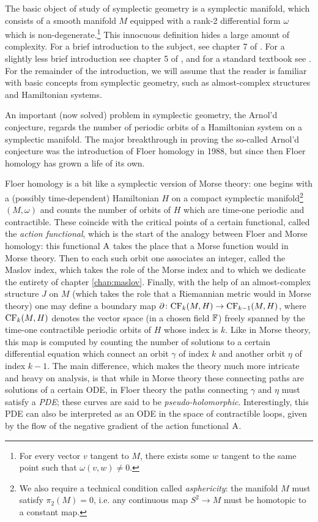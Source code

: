 The basic object of study of symplectic geometry is a symplectic manifold, which consists of a smooth manifold $M$ equipped with a rank-2 differential form $\omega$ which is non-degenerate.\footnote{For every vector $v$ tangent to $M$, there exists some $w$ tangent to the same point such that $\omega(v,w) \neq 0$.} This innocuous definition hides a large amount of complexity. For a brief introduction to the subject, see chapter 7 of \cite{polterovich}. For a slightly less brief introduction see chapter 5 of \cite{audin}, and for a standard textbook see \cite{mcduff}. For the remainder of the introduction, we will assume that the reader is familiar with basic concepts from symplectic geometry, such as almost-complex structures and Hamiltonian systems.

An important (now solved) problem in symplectic geometry, the Arnol'd conjecture, regards the number of periodic orbits of a Hamiltonian system on a symplectic manifold. The major breakthrough in proving the so-called Arnol'd conjecture was the introduction of Floer homology in 1988, but since then Floer homology has grown a life of its own.

Floer homology is a bit like a symplectic version of Morse theory: one begins with a (possibly time-dependent) Hamiltonian $H$ on a compact symplectic manifold\footnote{We also require a technical condition called \emph{asphericity}: the manifold $M$ must satisfy $\pi_2(M) = 0$, i.e. any continuous map $S^2 \to M$ must be homotopic to a constant map.} $(M,\omega)$ and counts the number of orbits of $H$ which are time-one periodic and contractible. These coincide with the critical points of a certain functional, called the \emph{action functional}, which is the start of the analogy between Floer and Morse homology: this functional $\AA$ takes the place that a Morse function would in Morse theory. Then to each such orbit one associates an integer, called the Maslov index, which takes the role of the Morse index and to which we dedicate the entirety of chapter \ref{chap:maslov}. Finally, with the help of an almost-complex structure $J$ on $M$ (which takes the role that a Riemannian metric would in Morse theory) one may define a boundary map $\partial \colon \CF_k(M,H) \to \CF_{k-1}(M,H)$, where $\CF_k(M,H)$ denotes the vector space (in a chosen field $\FF$) freely spanned by the time-one contractible periodic orbits of $H$ whose index is $k$. Like in Morse theory, this map is computed by counting the number of solutions to a certain differential equation which connect an orbit $\gamma$ of index $k$ and another orbit $\eta$ of index $k-1$. The main difference, which makes the theory much more intricate and heavy on analysis, is that while in Morse theory these connecting paths are solutions of a certain ODE, in Floer theory the paths connecting $\gamma$ and $\eta$ must satisfy a \emph{PDE}; these curves are said to be \emph{pseudo-holomorphic}. Interestingly, this PDE can also be interpreted as an ODE in the space of contractible loops, given by the flow of the negative gradient of the action functional $\AA$.

